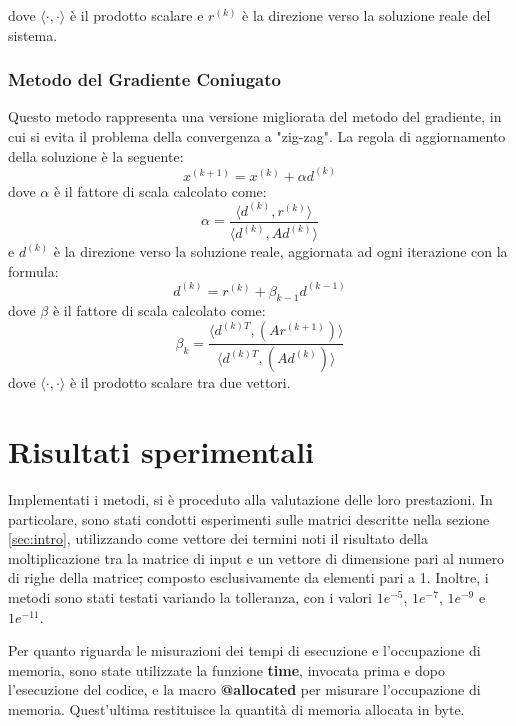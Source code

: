 dove $\langle \cdot, \cdot \rangle$ è il prodotto scalare e $r^{(k)}$ è la direzione
verso la soluzione reale del sistema.

\subsubsection{Metodo del Gradiente Coniugato}
Questo metodo rappresenta una versione migliorata del metodo del gradiente, in
cui si evita il problema della convergenza a "zig-zag". La regola di aggiornamento
della soluzione è la seguente:
\begin{equation}
    x^{(k+1)} = x^{(k)} + \alpha d^{(k)}
\end{equation}
dove $\alpha$ è il fattore di scala calcolato come:
\begin{equation}
    \alpha = \frac{\langle d^{(k)}, r^{(k)}\rangle}{\langle d^{(k)}, Ad^{(k)}\rangle}
\end{equation}
e $d^{(k)}$ è la direzione verso la soluzione reale, aggiornata ad ogni iterazione
con la formula:
\begin{equation}
    d^{(k)} = r^{(k)} + \beta_{k-1} d^{(k-1)}
\end{equation}
dove $\beta$ è il fattore di scala calcolato come:
\begin{equation}
    \beta_k = \frac{\langle d^{(k)T}, (Ar^{(k + 1)})\rangle}{\langle d^{(k)T}, (Ad^{(k)})\rangle}
\end{equation}
dove $\langle \cdot, \cdot \rangle$ è il prodotto scalare tra due vettori.

\section{Risultati sperimentali}
Implementati i metodi, si è proceduto alla valutazione delle loro prestazioni.
In particolare, sono stati condotti esperimenti sulle matrici descritte nella
sezione \ref{sec:intro}, utilizzando come vettore dei termini noti il risultato
della moltiplicazione tra la matrice di input e un vettore di dimensione pari al
numero di righe della matrice\st{,} composto esclusivamente da elementi pari a 1.
Inoltre, i metodi sono stati testati variando la tolleranza, con i valori $1e^{-5}$,
$1e^{-7}$, $1e^{-9}$ e $1e^{-11}$.

Per quanto riguarda le misurazioni dei tempi di esecuzione e l'occupazione di
memoria, sono state utilizzate la funzione \textbf{time}, invocata prima e dopo
l'esecuzione del codice, e la macro \textbf{@allocated} per misurare l'occupazione
di memoria. Quest'ultima restituisce la quantità di memoria allocata in byte.

